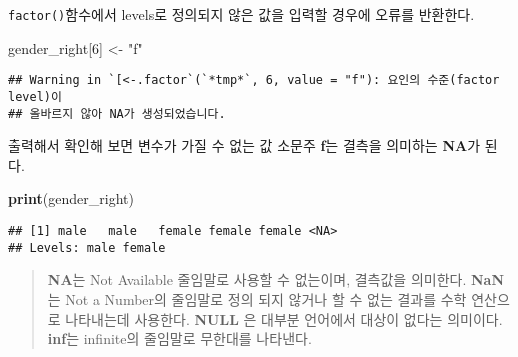 \documentclass[
]{article}
\newenvironment{Shaded}{\begin{snugshade}}{\end{snugshade}}
\newcommand{\DecValTok}[1]{\textcolor[rgb]{0.00,0.00,0.81}{#1}}
\newcommand{\FunctionTok}[1]{\textcolor[rgb]{0.13,0.29,0.53}{\textbf{#1}}}
\newcommand{\NormalTok}[1]{#1}
\newcommand{\OtherTok}[1]{\textcolor[rgb]{0.56,0.35,0.01}{#1}}
\newcommand{\StringTok}[1]{\textcolor[rgb]{0.31,0.60,0.02}{#1}}
\begin{document}
\texttt{factor()}함수에서 levels로 정의되지 않은 값을 입력할 경우에
오류를 반환한다.

\begin{Shaded}
\begin{Highlighting}[]
\NormalTok{gender\_right[}\DecValTok{6}\NormalTok{] }\OtherTok{\textless{}{-}} \StringTok{"f"}
\end{Highlighting}
\end{Shaded}

\begin{verbatim}
## Warning in `[<-.factor`(`*tmp*`, 6, value = "f"): 요인의 수준(factor level)이
## 올바르지 않아 NA가 생성되었습니다.
\end{verbatim}

출력해서 확인해 보면 변수가 가질 수 없는 값 소문주 \textbf{f}는 결측을
의미하는 \textbf{NA}가 된다.

\begin{Shaded}
\begin{Highlighting}[]
\FunctionTok{print}\NormalTok{(gender\_right)}
\end{Highlighting}
\end{Shaded}

\begin{verbatim}
## [1] male   male   female female female <NA>  
## Levels: male female
\end{verbatim}

\begin{quote}
\textbf{NA}는 Not Available 줄임말로 사용할 수 없는이며, 결측값을
의미한다. \textbf{NaN}는 Not a Number의 줄임말로 정의 되지 않거나 할 수
없는 결과를 수학 연산으로 나타내는데 사용한다. \textbf{NULL} 은 대부분
언어에서 대상이 없다는 의미이다. \textbf{inf}는 infinite의 줄임말로
무한대를 나타낸다.
\end{quote}
\end{document}
